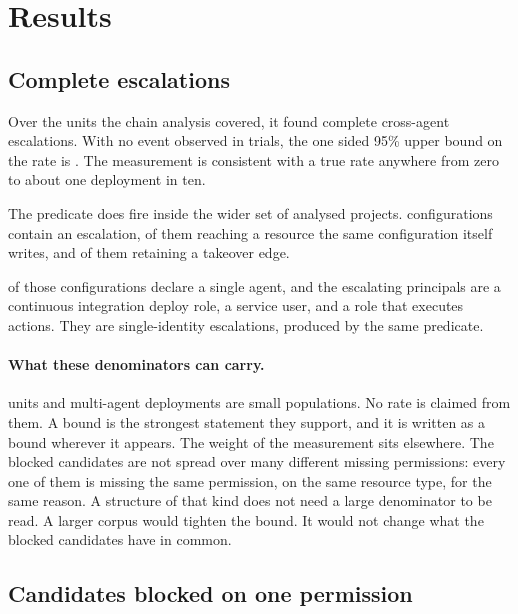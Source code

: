\section{Results}
\label{sec:results}

\subsection{Complete escalations}

Over the \nChainDenominator units the chain analysis covered, it found
\nChainsFound complete cross-agent escalations. With no event observed in
\nChainDenominator trials, the one sided 95\% upper bound on the rate is
\chainBound. The measurement is consistent with a true rate anywhere from
zero to about one deployment in ten.

The predicate does fire inside the wider set of \nProjects analysed projects.
\nEscalating configurations contain an escalation, \nEscalatingOwnResource of
them reaching a resource the same configuration itself writes, and
\nSurvivingTakeover of them retaining a takeover edge.

\nEscalatingSingleAgent of those \nEscalating configurations declare a single
agent, and the escalating principals are a continuous integration
deploy role, a service user, and a role that executes actions. They are single-identity
escalations, produced by the same predicate.

\paragraph{What these denominators can carry.}
\nChainDenominator units and \nMultiAgentRuntimes multi-agent deployments are
small populations. No rate is claimed from them. A bound is the strongest
statement they support, and it is written as a bound wherever it appears. The
weight of the measurement sits elsewhere. The \nBlocked blocked candidates
are not spread over many different missing permissions: every one of them is
missing the same permission, on the same resource type, for the same reason.
A structure of that kind does not need a large denominator to be read. A
larger corpus would tighten the bound. It would not change what the blocked
candidates have in common.

\subsection{Candidates blocked on one permission}

